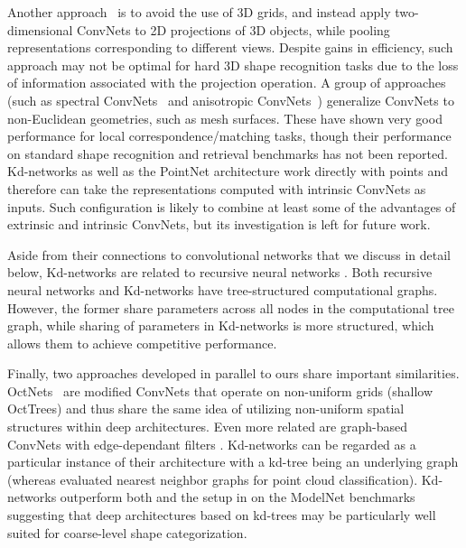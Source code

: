 \documentclass[10pt,twocolumn,letterpaper]{article}
\begin{document}
Another approach~\cite{Su15,Qi16a} is to avoid the use of 3D grids, and instead apply two-dimensional ConvNets to 2D projections of 3D objects, while pooling representations corresponding to different views. Despite gains in efficiency, such approach may not be optimal for hard 3D shape recognition tasks due to the loss of information associated with the projection operation. A group of approaches (such as spectral ConvNets~\cite{Bruna13,Boscaini15} and anisotropic ConvNets~\cite{Boscaini16}) generalize ConvNets to non-Euclidean geometries, such as mesh surfaces. These have shown very good performance for local correspondence/matching tasks, though their performance on standard shape recognition and retrieval benchmarks has not been reported. Kd-networks as well as the PointNet architecture \cite{Qi16b} work directly with points and therefore can take the representations computed with intrinsic ConvNets as inputs. Such configuration is likely to combine at least some of the advantages of extrinsic and intrinsic ConvNets, but its investigation is left for future work.

Aside from their connections to convolutional networks that we discuss in detail below, Kd-networks are related to recursive neural networks \cite{Socher11}. Both recursive neural networks and Kd-networks have tree-structured computational graphs. However, the former share parameters across all nodes in the computational tree graph, while sharing of parameters in Kd-networks is more structured, which allows them to achieve competitive performance.

Finally, two approaches developed in parallel to ours share important similarities. OctNets~\cite{Riegler17} are modified ConvNets that operate on non-uniform grids (shallow OctTrees) and thus share the same idea of utilizing non-uniform spatial structures within deep architectures. Even more related are graph-based ConvNets with edge-dependant filters \cite{Simonovsky17}. Kd-networks can be regarded as a particular instance of their architecture with a kd-tree being an underlying graph (whereas \cite{Simonovsky17} evaluated nearest neighbor graphs for point cloud classification). Kd-networks outperform both \cite{Riegler17} and the setup in \cite{Simonovsky17} on the ModelNet benchmarks suggesting that deep architectures based on kd-trees may be particularly well suited for coarse-level shape categorization.


 \newcommand{\x}{\mathtt{x}}
\newcommand{\y}{\mathtt{y}}
\newcommand{\z}{\mathtt{z}}
\newcommand{\tk}{\mathbf{t}}
\newcommand{\Sk}{S}
\renewcommand{\v}{\mathbf{v}}
\newcommand{\vt}{\tilde{\mathbf{v}}}
\newcommand{\f}{\mathbf{f}}
\newcommand{\W}[2]{W_{#2}^{#1}}
\newcommand{\Wt}[2]{\tilde{W}_{#2}^{#1}}
\newcommand{\Wx}[1]{W_\x^{#1}}
\newcommand{\Wy}[1]{W_\y^{#1}}
\newcommand{\Wz}[1]{W_\z^{#1}}
\newcommand{\bb}[2]{\mathbf{b}_{#2}^{#1}}
\newcommand{\bbt}[2]{\tilde{\mathbf{b}}_{#2}^{#1}}
\newcommand{\bx}[1]{\mathbf{b}_\x^{#1}}
\newcommand{\by}[1]{\mathbf{b}_\y^{#1}}
\newcommand{\bz}[1]{\mathbf{b}_\z^{#1}}
\newcommand{\T}{\mathcal{T}}
\end{document}
